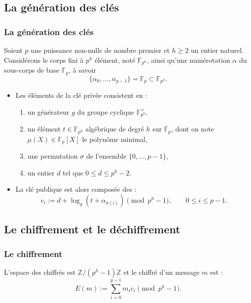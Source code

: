 \documentclass{beamer}
\theoremstyle{definition}
\theoremstyle{remark}
\def\Z{\mathbb Z}
\def\gf #1{\mathbb{F}_{#1}}
\begin{document}
\subsection{La génération des clés}
\begin{frame}
  \frametitle{La génération des clés}
  Soient $p$ une puissance non-nulle de nombre premier et $h \geqslant 2$ un entier naturel. Considérons le corps fini à $p^h$ élément, noté $\gf{p^h}$, ainsi qu'une numérotation $\alpha$ du sous-corps de base $\gf{p}$, à savoir $$\{\alpha_0,\dots, \alpha_{p-1}\} = \gf{p} \subset \gf{p^h}.$$

  \begin{itemize}
  \item Les éléments de la clé privée consistent en :
    \begin{enumerate}
    \item un générateur $g$ du groupe cyclique $\gf{p^h}^\times$,
    \item un élément $t \in \gf{p^h}$ algébrique de degré $h$ sur $\gf{p}$, dont on note $\mu(X) \in \gf{p}[X]$ le polynôme minimal,
    \item une permutation $\sigma$ de l'ensemble $\{0, \dots, p-1\}$,
    \item un entier $d$ tel que $0 \leqslant d \leqslant p^h-2$.
    \end{enumerate}
  \item La clé publique est alors composée des :
    $$c_i := d + \log_g\left(t + \alpha_{\sigma(i)}\right) \pmod{p^h-1}, \qquad 0 \leqslant i \leqslant p-1.$$
  \end{itemize}
\end{frame}

\subsection{Le chiffrement et le déchiffrement}
\begin{frame}
  \frametitle{Le chiffrement}
  L'espace des chiffrés est $\Z/(p^h-1)\Z$ et le chiffré d'un message $m$ est :
$$E(m) := \sum_{i=0}^{p-1} m_ic_i \pmod{p^h-1}.$$
\end{frame}
\end{document}
